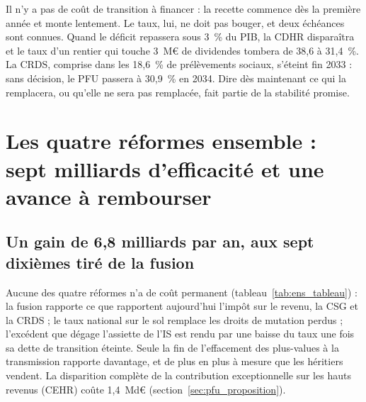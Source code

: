 \documentclass[11pt,a4paper]{article}
\begin{document}
Il n'y a pas de coût de transition à financer : la recette commence dès la première année et monte lentement. Le
taux, lui, ne doit pas bouger, et deux échéances sont connues. Quand le déficit repassera sous 3~\% du PIB, la CDHR
disparaîtra et le taux d'un rentier qui touche 3~M€ de dividendes tombera de 38,6 à 31,4~\%. La CRDS, comprise dans
les 18,6~\% de prélèvements sociaux, s'éteint fin 2033 : sans décision, le PFU passera à 30,9~\% en 2034. Dire dès
maintenant ce qui la remplacera, ou qu'elle ne sera pas remplacée, fait partie de la stabilité promise.


\section{Les quatre réformes ensemble : sept milliards d'efficacité et une avance à rembourser}\label{sec:ensemble}

\subsection{Un gain de 6,8 milliards par an, aux sept dixièmes tiré de la fusion}\label{sec:ens_bilan}

Aucune des quatre réformes n'a de coût permanent (tableau~\ref{tab:ens_tableau}) : la fusion rapporte ce que rapportent
aujourd'hui l'impôt sur le revenu, la CSG et la CRDS ; le taux national sur le sol remplace les droits de mutation
perdus ; l'excédent que dégage l'assiette de l'IS est rendu par une baisse du taux une fois sa dette de transition
éteinte. Seule la fin de l'effacement des plus-values à la transmission rapporte davantage, et de plus en plus à mesure
que les héritiers vendent. La disparition complète de la contribution exceptionnelle sur les hauts revenus (CEHR) coûte
1,4~Md€ (section~\ref{sec:pfu_proposition}).
\end{document}
